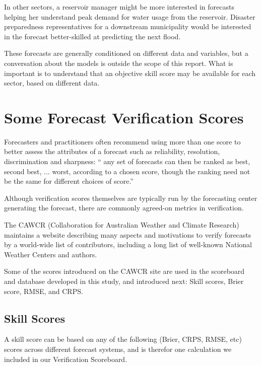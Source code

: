 \documentclass[logos,parttoc,morelanguage=french,morelanguage=german,draft]{orsay-memoire}
\begin{document}
In other sectors, a reservoir manager might be more interested in forecasts helping her understand peak demand for water usage from the reservoir. Disaster preparedness representatives for a downstream municipality would be interested in the forecast better-skilled at predicting the next flood.

These forecasts are generally conditioned on different data and variables, but a conversation about the models is outside the scope of this report. What is important is to understand that an objective skill score may be available for each sector, based on different data.

\section{Some Forecast Verification Scores}


Forecasters and practitioners often recommend using more than one score to better assess the attributes of a forecast such as reliability, resolution, discrimination and sharpness: “ any set of forecasts can then be ranked as best, second best, ...  worst, according to a chosen score, though the ranking need not be the same for different choices of score.”

Although verification scores themselves are typically run by the forecasting center generating the forecast, there are commonly agreed-on metrics in verification.

The CAWCR (Collaboration for Australian Weather and Climate Research) maintains a website \autocite{url:cawcr} describing many aspects and motivations to verify forecasts by a world-wide list of contributors, including a long list of well-known National Weather Centers and authors.

Some of the scores introduced on the CAWCR site are used in the scoreboard and database developed in this study, and introduced next: Skill scores, Brier score, RMSE, and CRPS.

\subsection{Skill Scores}

A skill score can be based on any of the following (Brier, CRPS, RMSE, etc) scores across different forecast systems, and is therefor one calculation we included in our Verification Scoreboard. 
\end{document}
